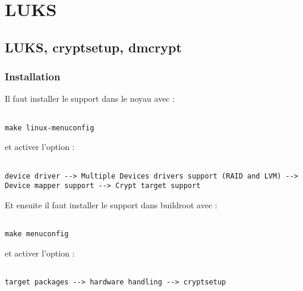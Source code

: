 
\chapter{LUKS} %

\label{Chapitre 6.1} %




\section{LUKS, cryptsetup, dmcrypt}
\subsection{Installation}

Il faut installer le support dans le noyau avec : 
\begin{lstlisting}[frame=single,style=Console]  % Start your code-block

make linux-menuconfig
\end{lstlisting}

et activer l'option : 
\begin{lstlisting}[frame=single,style=Console]  % Start your code-block

device driver --> Multiple Devices drivers support (RAID and LVM) --> Device mapper support --> Crypt target support
\end{lstlisting}

Et ensuite il faut installer le support dans buildroot avec : 
\begin{lstlisting}[frame=single,style=Console]  % Start your code-block

make menuconfig
\end{lstlisting}

et activer l'option : 
\begin{lstlisting}[frame=single,style=Console]  % Start your code-block

target packages --> hardware handling --> cryptsetup
\end{lstlisting}

